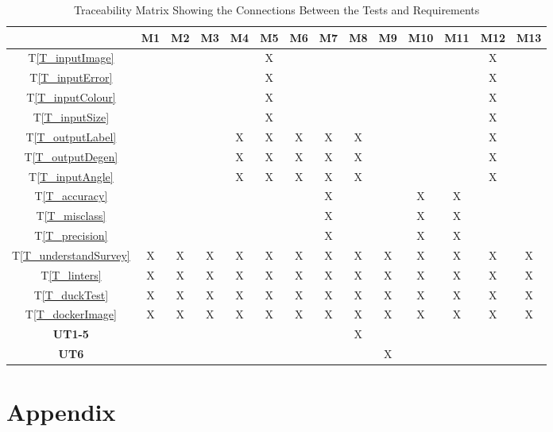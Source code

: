 \documentclass[12pt, titlepage]{article}
\newcommand{\tref}[1]{T\ref{#1}}
\begin{document}
\begin{table}[h!]
  \centering
  \begin{tabular}{|c|c|c|c|c|c|c|c|c|c|c|c|c|c|}
  \hline
    & M1
    & M2
    & M3
    & M4
    & M5
    & M6
    & M7
    & M8
    & M9
    & M10
    & M11
    & M12
    & M13
  \\ \hline
  \tref{T_inputImage}           & & & & &X& & & & & & &X& \\ \hline
  \tref{T_inputError}           & & & & &X& & & & & & &X& \\ \hline
  \tref{T_inputColour}          & & & & &X& & & & & & &X& \\ \hline
  \tref{T_inputSize}            & & & & &X& & & & & & &X& \\ \hline
  \tref{T_outputLabel}          & & & &X&X&X&X&X& & & &X& \\ \hline
  \tref{T_outputDegen}          & & & &X&X&X&X&X& & & &X& \\ \hline
  \tref{T_inputAngle}           & & & &X&X&X&X&X& & & &X& \\ \hline
  \tref{T_accuracy}             & & & & & & &X& & &X&X& & \\ \hline
  \tref{T_misclass}             & & & & & & &X& & &X&X& & \\ \hline
  \tref{T_precision}            & & & & & & &X& & &X&X& & \\ \hline
  \tref{T_understandSurvey}     &X&X&X&X&X&X&X&X&X&X&X&X&X\\ \hline
  \tref{T_linters}              &X&X&X&X&X&X&X&X&X&X&X&X&X\\ \hline
  \tref{T_duckTest}             &X&X&X&X&X&X&X&X&X&X&X&X&X\\ \hline
  \tref{T_dockerImage}          &X&X&X&X&X&X&X&X&X&X&X&X&X\\ \hline
  \textbf{UT1-5}                & & & & & & & &X& & & & & \\ \hline
  \textbf{UT6}                  & & & & & & & & &X& & & & \\ \hline
  \end{tabular}
  \caption{Traceability Matrix Showing the Connections Between the Tests and Requirements}
  \label{Table:A_trace}
\end{table}
\newpage





\newpage

\section{Appendix}
\end{document}

